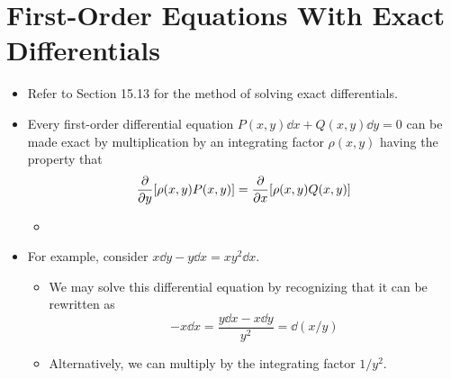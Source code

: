 \documentclass[../main.tex]{subfiles}
\begin{document}
\section{First-Order Equations With Exact Differentials}
\begin{itemize}
    \item Refer to Section 15.13 for the method of solving exact differentials.
    \item Every first-order differential equation $P(x,y)\dd{x}+Q(x,y)\dd{y}=0$ can be made exact by multiplication by an integrating factor $\rho(x,y)$ having the property that
    \begin{equation*}
        \pdv{y}[\rho(x,y)P(x,y)] = \pdv{x}[\rho(x,y)Q(x,y)]
    \end{equation*}
    \begin{itemize}
        \item {}
    \end{itemize}
    \item For example, consider $x\dd{y}-y\dd{x}=xy^2\dd{x}$.
    \begin{itemize}
        \item We may solve this differential equation by recognizing that it can be rewritten as
        \begin{equation*}
            -x\dd{x} = \frac{y\dd{x}-x\dd{y}}{y^2} = \dd{(x/y)}
        \end{equation*}
        \item Alternatively, we can multiply by the integrating factor $1/y^2$.
    \end{itemize}
\end{itemize}
\end{document}
